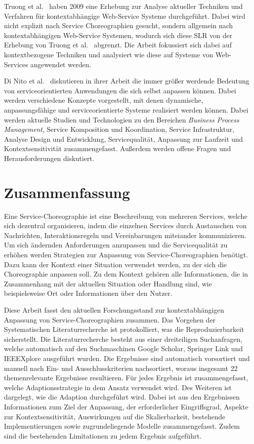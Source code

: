 \documentclass[conference,compsoc,ngerman]{IEEEtran}
\begin{document}
Truong et al.~\cite{truong2009survey} haben 2009 eine Erhebung zur Analyse aktueller Techniken und Verfahren für kontextabhängige Web-Service Systeme durchgeführt. Dabei wird nicht explizit nach Service Choreographien gesucht, sondern allgemein nach kontextabhängigen Web-Service Systemen, wodurch sich diese SLR von der Erhebung von Truong et al.~\cite{truong2009survey} abgrenzt. Die Arbeit fokussiert sich dabei auf kontextbezogene Techniken und analysiert wie diese auf Systeme von Web-Services angewendet werden.

Di Nito et al.~\cite{di2008journey} diskutieren in ihrer Arbeit die immer größer werdende Bedeutung von serviceorientierten Anwendungen die sich selbst anpassen können. Dabei werden verschiedene Konzepte vorgestellt, mit denen dynamische, anpassungsfähige und serviceorientierte Systeme realisiert werden können. Dabei werden aktuelle Studien und Technologien zu den Bereichen \textit{Business Process Management}, Service Komposition und Koordination, Service Infrastruktur, Analyse Design und Entwicklung, Servicequalität, Anpassung zur Laufzeit und Kontextsensitivität zusammengefasst. Außerdem werden offene Fragen und Herausforderungen diskutiert.

\section{Zusammenfassung}\label{s:zusammenfassung}
Eine Service-Choreographie ist eine Beschreibung von mehreren Services, welche sich dezentral organisieren, indem die einzelnen Services durch Austauschen von Nachrichten, Interaktionsregeln und Vereinbarungen miteiander kommunizieren. Um sich ändernden Anforderungen anzupassen und die Servicequalität zu erhöhen werden Strategien zur Anpassung von Service-Choreographien benötigt. Dazu kann der Kontext einer Situation verwendet werden, zu der sich die Choreographie anpassen soll. Zu dem Kontext gehören alle Informationen, die in Zusammenhang mit der aktuellen Situation oder Handlung sind, wie beispielsweise Ort oder Informationen über den Nutzer.

Diese Arbeit fasst den aktuellen Forschungsstand zur kontextabhängigen Anpassung von Service-Choreographien zusammen. Das Vorgehen der Systematischen Literaturrecherche ist protokolliert, was die Reproduzierbarkeit sicherstellt. Die Literaturrecherche besteht aus einer dreiteiligen Suchanfragen, welche automatisch auf den Suchmaschinen Google Scholar, Springer Link und IEEEXplore ausgeführt wurden. Die Ergebnisse sind automatisch vorsortiert und manuell nach Ein- und Ausschlusskriterien nachsortiert, woraus insgesamt 22
themenrelevante Ergebnisse resultieren. Für jedes Ergebnis ist zusammengefasst, welche Adaptionsstrategie in dem Ansatz verwendet wird. Des Weiteren ist dargelegt, wie die Adaption durchgeführt wird. Dabei ist aus den Ergebnissen Informationen zum Ziel der Anpassung, der erforderlicher Eingriffsgrad, Aspekte zur Kontextsensitivität, Auswirkungen auf die Skalierbarkeit, bestehende Implementierungen sowie zugrundeliegende Modelle zusammengefasst. Zudem sind die bestehenden Limitationen zu jedem Ergebnis aufgeführt.
\end{document}
